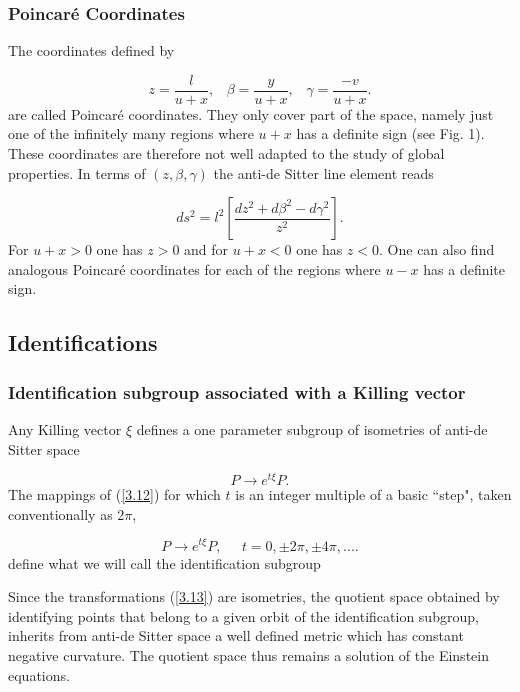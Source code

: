 \documentclass[12pt]{article}
\newcounter{c1} \newcounter{c2}
\newcommand{\bb}{\begin{equation}}
\newcommand{\ee}{\end{equation}}
\begin{document}
\subsubsection{Poincar\'e Coordinates}

The coordinates defined by

\bb
z=\frac{l}{u+x}, \;\;\; \beta=\frac{y}{u+x}, \;\;\;
\gamma=\frac{-v}{u+x}.
\label{3.10}
\ee
%
are called Poincar\'e coordinates. They only cover part of the
space, namely just one of the infinitely many regions where $u+x$
has a definite sign (see Fig. 1).  These coordinates are
therefore not well adapted to the study of global properties. In
terms of $(z,\beta,\gamma)$ the anti-de Sitter line element
reads

\bb
ds^2 = l^2 \left[ \frac{ dz^2 + d\beta^2 - d\gamma^2 }{z^2}
\right].
\label{3.11}
\ee
%
For $u+x>0$ one has $z>0$ and for $u+x<0$ one has $z<0$. One can
also find analogous Poincar\'e coordinates for each of the regions
where $u-x$ has a definite sign.


\subsection{Identifications}


\subsubsection{Identification subgroup associated with a Killing vector}

Any Killing vector $\xi$ defines a one parameter subgroup of
isometries of anti-de Sitter space

\bb
P \rightarrow e^{t\xi} P.
\label{3.12}
\ee
%
The mappings of (\ref{3.12}) for which $t$ is an integer
multiple of a basic ``step", taken conventionally as $2\pi$,

\bb
P\rightarrow e^{t\xi}P, \;\;\;\;\;  t=0,\pm 2\pi,\pm 4\pi,....
\label{3.13}
\ee
%
define what we will call the identification subgroup

Since the transformations (\ref{3.13}) are isometries, the
quotient space obtained by identifying points that belong to a
given orbit of the identification subgroup, inherits from
anti-de Sitter space a well defined metric which has constant
negative curvature. The quotient space thus remains a solution
of the Einstein equations.
\end{document}
